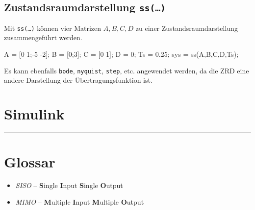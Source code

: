 \documentclass[
  10pt,
  a4paper,
  german]{article}
\newenvironment{Shaded}{}{}
\newcommand{\FloatTok}[1]{\textcolor[rgb]{0.00,0.36,0.77}{#1}}
\newcommand{\NormalTok}[1]{\textcolor[rgb]{0.14,0.16,0.18}{#1}}
\newcommand{\OperatorTok}[1]{\textcolor[rgb]{0.14,0.16,0.18}{#1}}
\newcommand{\VariableTok}[1]{\textcolor[rgb]{0.89,0.38,0.04}{#1}}
\providecommand{\tightlist}{%
  \setlength{\itemsep}{0pt}\setlength{\parskip}{0pt}}\usepackage{longtable,booktabs,array}
\numberwithin{equation}{section}
\begin{document}
\begin{multicols}{2}
\hypertarget{zustandsraumdarstellung-ss}{%
\subsection{\texorpdfstring{Zustandsraumdarstellung
\texttt{ss(…)}}{Zustandsraumdarstellung ss(\ldots)}}\label{zustandsraumdarstellung-ss}}

Mit \texttt{ss(…)} können vier Matrizen \(A, B,C,D\) zu einer
Zustandsraumdarstellung zusammengeführt werden.

\begin{Shaded}
\begin{Highlighting}[]
\VariableTok{A} \OperatorTok{=}\NormalTok{ [}\FloatTok{0} \FloatTok{1}\OperatorTok{;{-}}\FloatTok{5} \OperatorTok{{-}}\FloatTok{2}\NormalTok{]}\OperatorTok{;}
\VariableTok{B} \OperatorTok{=}\NormalTok{ [}\FloatTok{0}\OperatorTok{;}\FloatTok{3}\NormalTok{]}\OperatorTok{;}
\VariableTok{C} \OperatorTok{=}\NormalTok{ [}\FloatTok{0} \FloatTok{1}\NormalTok{]}\OperatorTok{;}
\VariableTok{D} \OperatorTok{=} \FloatTok{0}\OperatorTok{;}
\VariableTok{Ts} \OperatorTok{=} \FloatTok{0.25}\OperatorTok{;}
\VariableTok{sys} \OperatorTok{=} \VariableTok{ss}\NormalTok{(}\VariableTok{A}\OperatorTok{,}\VariableTok{B}\OperatorTok{,}\VariableTok{C}\OperatorTok{,}\VariableTok{D}\OperatorTok{,}\VariableTok{Ts}\NormalTok{)}\OperatorTok{;}
\end{Highlighting}
\end{Shaded}

Es kann ebenfalls \texttt{bode}, \texttt{nyquist}, \texttt{step}, etc.
angewendet werden, da die ZRD eine andere Darstellung der
Übertragungsfunktion ist.

\hypertarget{simulink}{%
\section{Simulink}\label{simulink}}

\end{multicols}

\begin{center}\rule{0.5\linewidth}{0.5pt}\end{center}

\hypertarget{glossar}{%
\section{Glossar}\label{glossar}}

\begin{itemize}
\tightlist
\item
  \emph{SISO} -- \textbf{S}ingle \textbf{I}nput \textbf{S}ingle
  \textbf{O}utput
\item
  \emph{MIMO} -- \textbf{M}ultiple \textbf{I}nput \textbf{M}ultiple
  \textbf{O}utput
\end{itemize}
\end{document}
